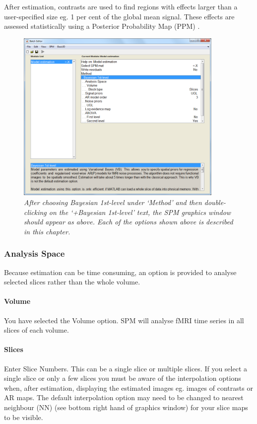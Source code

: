 After estimation, contrasts are used to find regions with effects larger than a user-specified size eg. 1 per cent of the global mean signal. These effects are assessed statistically using a Posterior Probability Map (PPM) \cite{karl_posterior}.

\begin{figure}
\includegraphics[width=100mm]{fmri_est/bayes_options}
\caption{\em After choosing Bayesian 1st-level under `Method' and then double-clicking on the `+Bayesian 1st-level' text, the SPM graphics window should appear as above. Each of the options shown above is described in this chapter. \label{bayes_options}}
\end{figure}

\subsubsection{Analysis Space}
Because estimation can be time consuming, an option is provided to analyse selected slices rather than the whole volume.


\paragraph{Volume}
You have selected the Volume option. SPM will analyse fMRI time series in all slices of each volume.


\paragraph{Slices}
Enter Slice Numbers. This can be a single slice or multiple slices. If you select a single slice or only a few slices you must be aware of the interpolation options when, after estimation, displaying the estimated images eg. images of contrasts or AR maps. The default interpolation option may need to be changed to nearest neighbour (NN) (see bottom right hand of graphics window) for your slice maps to be visible.


